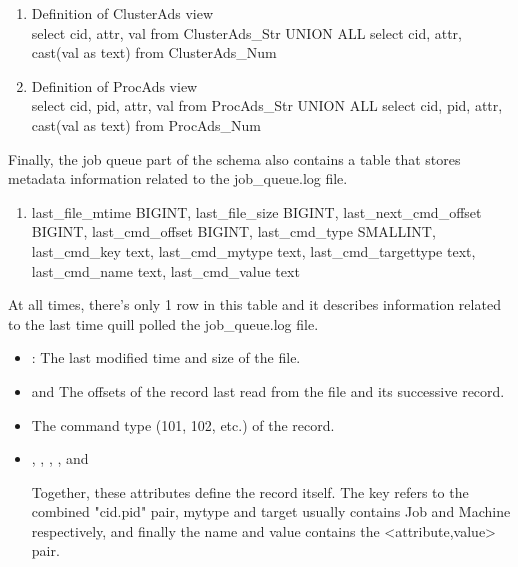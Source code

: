 \begin{enumerate}
\item Definition of ClusterAds view\\
		{select cid, 
		attr, 
		val from ClusterAds\_Str UNION ALL
		select cid, 
		attr, 
		cast(val as text) from ClusterAds\_Num}


\item Definition of ProcAds view\\
		{select cid, 
		pid, 
		attr, 
		val from ProcAds\_Str UNION ALL
		select cid, 
		pid, 
		attr, 
		cast(val as text) from ProcAds\_Num}

\end{enumerate}

Finally, the job queue part of the schema also contains a table that
stores metadata information related to the job\_queue.log file.

\begin{enumerate}
\item {}
        {last\_file\_mtime         BIGINT,
        last\_file\_size          BIGINT,
        last\_next\_cmd\_offset    BIGINT,
        last\_cmd\_offset         BIGINT,
        last\_cmd\_type           SMALLINT,
        last\_cmd\_key            text,
        last\_cmd\_mytype         text,
        last\_cmd\_targettype     text,
        last\_cmd\_name           text,
        last\_cmd\_value          text}
\end{enumerate}
	
At all times, there's only 1 row in this table and it describes
information related to the last time quill polled the job\_queue.log file.

\begin{itemize}
\item {}:
	The last modified time and size of the file.

\item {} and 
	The offsets of the record last read from the file and its successive record.

\item {}
	The command type (101, 102, etc.) of the record.

\item	{}, 
		, 
		,
		,
		and

	Together, these attributes define the record itself.	The key
	refers to the combined "cid.pid" pair, mytype and target usually
	contains Job and Machine respectively, and finally the name and
	value contains the <attribute,value> pair.
\end{itemize}

